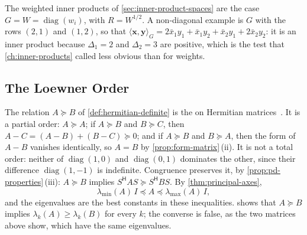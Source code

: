 The weighted inner products of \cref{sec:inner-product-spaces} are the case $G=W=\operatorname{diag}(w_i)$, with $R=W^{1/2}$. A non-diagonal example is $G$ with the rows $(2,1)$ and $(1,2)$, so that $\langle\mathbf x,\mathbf y\rangle_G=2\bar x_1y_1+\bar x_1y_2+\bar x_2y_1+2\bar x_2y_2$: it is an inner product because $\Delta_1=2$ and $\Delta_2=3$ are positive, which is the test that \cref{ch:inner-products} called less obvious than for weights.

\subsection{The Loewner Order}

The relation $A\succeq B$ of \cref{def:hermitian-definite} is the  on Hermitian matrices~\cite{loewner1934}. It is a partial order: $A\succeq A$; if $A\succeq B$ and $B\succeq C$, then $A-C=(A-B)+(B-C)\succeq0$; and if $A\succeq B$ and $B\succeq A$, then the form of $A-B$ vanishes identically, so $A=B$ by \cref{prop:form-matrix}\,(ii). It is not a total order: neither of $\operatorname{diag}(1,0)$ and $\operatorname{diag}(0,1)$ dominates the other, since their difference $\operatorname{diag}(1,-1)$ is indefinite. Congruence preserves it, by \cref{prop:pd-properties}\,(iii): $A\succeq B$ implies $S^{\mathsf H}AS\succeq S^{\mathsf H}BS$. By \cref{thm:principal-axes},
\[
\lambda_{\min}(A)\,I\preceq A\preceq\lambda_{\max}(A)\,I ,
\]
and the eigenvalues are the best constants in these inequalities.  shows that $A\succeq B$ implies $\lambda_k(A)\ge\lambda_k(B)$ for every $k$; the converse is false, as the two matrices above show, which have the same eigenvalues.

